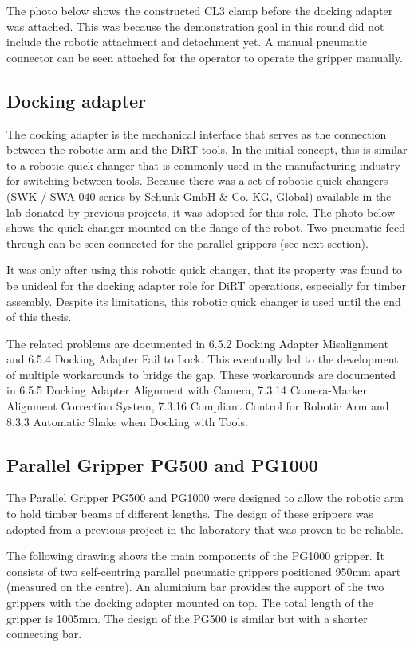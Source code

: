\begin{itemize}
The photo below shows the constructed CL3 clamp before the docking adapter was attached. This was because the demonstration goal in this round did not include the robotic attachment and detachment yet. A manual pneumatic connector can be seen attached for the operator to operate the gripper manually.

\subsection{Docking adapter}
The docking adapter is the mechanical interface that serves as the connection between the robotic arm and the DiRT tools. In the initial concept, this is similar to a robotic quick changer that is commonly used in the manufacturing industry for switching between tools. Because there was a set of robotic quick changers (SWK / SWA 040 series by Schunk GmbH & Co. KG, Global) available in the lab donated by previous projects, it was adopted for this role. The photo below shows the quick changer mounted on the flange of the robot. Two pneumatic feed through can be seen connected for the parallel grippers (see next section).

It was only after using this robotic quick changer, that its property was found to be unideal for the docking adapter role for DiRT operations, especially for timber assembly. Despite its limitations, this robotic quick changer is used until the end of this thesis.

The related problems are documented in 6.5.2 Docking Adapter Misalignment and 6.5.4 Docking Adapter Fail to Lock. This eventually led to the development of multiple workarounds to bridge the gap. These workarounds are documented in 6.5.5 Docking Adapter Alignment with Camera, 7.3.14 Camera-Marker Alignment Correction System, 7.3.16 Compliant Control for Robotic Arm and 8.3.3 Automatic Shake when Docking with Tools. 

\subsection{Parallel Gripper PG500 and PG1000}

The Parallel Gripper PG500 and PG1000 were designed to allow the robotic arm to hold timber beams of different lengths. The design of these grippers was adopted from a previous project in the laboratory that was proven to be reliable. 

The following drawing shows the main components of the PG1000 gripper. It consists of two self-centring parallel pneumatic grippers positioned 950mm apart (measured on the centre). An aluminium bar provides the support of the two grippers with the docking adapter mounted on top. The total length of the gripper is 1005mm. The design of the PG500 is similar but with a shorter connecting bar. 


\end{itemize}
